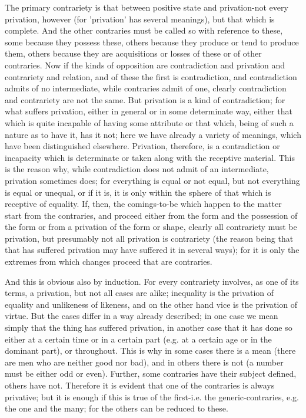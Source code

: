 The primary contrariety is that between positive state and privation-not every privation, however (for 'privation' has several meanings), but that which is complete. And the other contraries must be called so with reference to these, some because they possess these, others because they produce or tend to produce them, others because they are acquisitions or losses of these or of other contraries. Now if the kinds of opposition are contradiction and privation and contrariety and relation, and of these the first is contradiction, and contradiction admits of no intermediate, while contraries admit of one, clearly contradiction and contrariety are not the same. But privation is a kind of contradiction; for what suffers privation, either in general or in some determinate way, either that which is quite incapable of having some attribute or that which, being of such a nature as to have it, has it not; here we have already a variety of meanings, which have been distinguished elsewhere. Privation, therefore, is a contradiction or incapacity which is determinate or taken along with the receptive material. This is the reason why, while contradiction does not admit of an intermediate, privation sometimes does; for everything is equal or not equal, but not everything is equal or unequal, or if it is, it is only within the sphere of that which is receptive of equality. If, then, the comings-to-be which happen to the matter start from the contraries, and proceed either from the form and the possession of the form or from a privation of the form or shape, clearly all contrariety must be privation, but presumably not all privation is contrariety (the reason being that that has suffered privation may have suffered it in several ways); for it is only the extremes from which changes proceed that are contraries.

And this is obvious also by induction. For every contrariety involves, as one of its terms, a privation, but not all cases are alike; inequality is the privation of equality and unlikeness of likeness, and on the other hand vice is the privation of virtue. But the cases differ in a way already described; in one case we mean simply that the thing has suffered privation, in another case that it has done so either at a certain time or in a certain part (e.g. at a certain age or in the dominant part), or throughout. This is why in some cases there is a mean (there are men who are neither good nor bad), and in others there is not (a number must be either odd or even). Further, some contraries have their subject defined, others have not. Therefore it is evident that one of the contraries is always privative; but it is enough if this is true of the first-i.e. the generic-contraries, e.g. the one and the many; for the others can be reduced to these.

